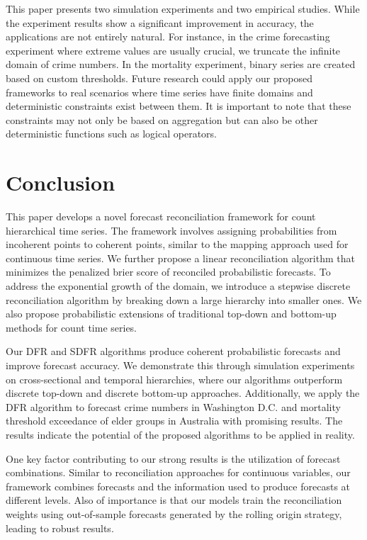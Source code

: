 \documentclass[a4paper,review,12pt,authoryear]{elsarticle}
\begin{document}
     This paper presents two simulation experiments and two empirical studies.
     While the experiment results show a significant improvement in accuracy, the applications are not entirely natural. 
     For instance, in the crime forecasting experiment where extreme values are usually crucial, we truncate the infinite domain of crime numbers. 
     In the mortality experiment, binary series are created based on custom thresholds.
     Future research could apply our proposed frameworks to real scenarios where time series have finite domains and deterministic constraints exist between them.  
     It is important to note that  these constraints may not only be based on aggregation but can also be other deterministic functions such as logical operators.


     

     \section{Conclusion}
     \label{sec:conclusion}
     
     This paper develops a novel forecast reconciliation framework for count hierarchical time series. 
     The framework involves assigning probabilities from incoherent points to coherent points, similar to the mapping approach used for continuous time series.
     We further propose a linear reconciliation algorithm that minimizes the penalized brier score of reconciled probabilistic forecasts.
     To address the exponential growth of the domain, we introduce a stepwise discrete reconciliation algorithm by breaking down a large hierarchy into smaller ones.
     We also propose probabilistic extensions of traditional top-down and bottom-up methods for count time series.
     
     Our DFR and SDFR algorithms produce coherent probabilistic forecasts and improve forecast accuracy. 
     We demonstrate this through simulation experiments on cross-sectional and temporal hierarchies, where our algorithms outperform discrete top-down and discrete bottom-up approaches. Additionally, we apply the DFR algorithm to forecast crime numbers in Washington D.C. and mortality threshold exceedance of elder groups in Australia with promising results.
     The results indicate the potential of the proposed algorithms to be applied in reality.
     
     One key factor contributing to our strong results is  the utilization of forecast combinations.
     Similar to reconciliation approaches for continuous variables, our framework combines forecasts and the information used to produce forecasts at different levels.
     Also of importance is that our models train the reconciliation weights using out-of-sample forecasts generated by the rolling origin strategy, leading to robust results. 
     
\end{document}
